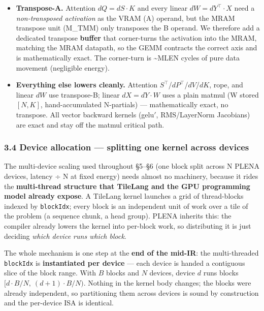 \documentclass[
  10pt,
]{article}
\providecommand{\tightlist}{%
  \setlength{\itemsep}{0pt}\setlength{\parskip}{0pt}}
\begin{document}
\begin{itemize}
\tightlist
\item
  \textbf{Transpose-A.} Attention \(dQ = dS\cdot K\) and every linear
  \(dW = dY^{\top}\!\cdot X\) need a \emph{non-transposed activation} as
  the VRAM (A) operand, but the MRAM transpose unit (M\_TMM) only
  transposes the B operand. We therefore add a dedicated transpose
  \textbf{buffer} that corner-turns the activation into the MRAM, matching
  the MRAM datapath, so the GEMM contracts the correct axis and is
  mathematically exact. The corner-turn is \textasciitilde MLEN cycles of
  pure data movement (negligible energy).
\item
  \textbf{Everything else lowers cleanly.} Attention
  \(S^{\top}\)/\(dP^{\top}\)/\(dV\)/\(dK\), rope, and linear \(dW\) use
  transpose-B; linear \(dX = dY\cdot W\) uses a plain matmul (W stored
  \([N,K]\), hand-accumulated N-partials) --- mathematically exact, no
  transpose. All vector backward kernels (gelu\('\), RMS/LayerNorm
  Jacobians) are exact and stay off the matmul critical path.
\end{itemize}

\subsubsection{3.4 Device allocation --- splitting one kernel across
devices}\label{device-allocation}

The multi-device scaling used throughout §5--§6 (one block split across N
PLENA devices, latency ÷ N at fixed energy) needs almost no machinery,
because it rides the \textbf{multi-thread structure that TileLang and the
GPU programming model already expose}. A TileLang kernel launches a grid of
thread-blocks indexed by \texttt{blockIdx}; every block is an independent
unit of work over a tile of the problem (a sequence chunk, a head group).
PLENA inherits this: the compiler already lowers the kernel into per-block
work, so distributing it is just deciding \emph{which device runs which
block}.

The whole mechanism is one step at the \textbf{end of the mid-IR}: the
multi-threaded \texttt{blockIdx} is \textbf{instantiated per device} — each
device is handed a contiguous slice of the block range. With \(B\) blocks
and \(N\) devices, device \(d\) runs blocks \([d\cdot B/N,\ (d{+}1)\cdot
B/N)\). Nothing in the kernel body changes; the blocks were already
independent, so partitioning them across devices is sound by construction
and the per-device ISA is identical.
\end{document}
